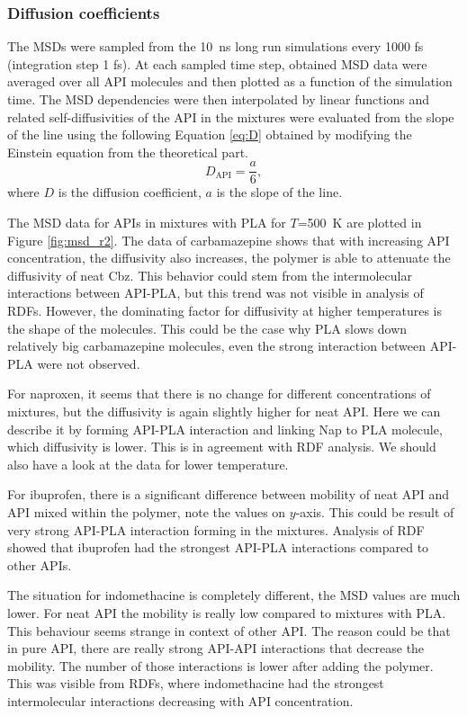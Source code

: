 \newpage
\subsubsection{Diffusion coefficients}
The MSDs were sampled from the 10~ns long run simulations every 1000 fs (integration step 1 fs). At each sampled time step, obtained MSD data were averaged over all API molecules and then plotted as a function of the simulation time. The MSD dependencies were then interpolated by linear functions and related self-diffusivities of the API in the mixtures were evaluated from the slope of the line using the following Equation \ref{eq:D} obtained by modifying the Einstein equation from the theoretical part.
\vspace{-0.25cm}
\begin{equation}\label{eq:D}
	D_{\text{API}} = \frac{a}{6}, 
\end{equation}
where $D$ is the diffusion coefficient, $a$ is the slope of the line.

The MSD data for APIs in mixtures with PLA for $T$=500~K are plotted in Figure \ref{fig:msd_r2}. The data of carbamazepine shows that with increasing API concentration, the diffusivity also increases, the polymer is able to attenuate the diffusivity of neat Cbz. This behavior could stem from the intermolecular interactions between API-PLA, but this trend was not visible in analysis of RDFs. However, the dominating factor for diffusivity at higher temperatures is the shape of the molecules. This could be the case why PLA slows down relatively big carbamazepine molecules, even the strong interaction between API-PLA were not observed. 

For naproxen, it seems that there is no change for different concentrations of mixtures, but the diffusivity is again slightly higher for neat API. Here we can describe it by forming API-PLA interaction and linking Nap to PLA molecule, which diffusivity is lower. This is in agreement with RDF analysis. We should also have a look at the data for lower temperature.

For ibuprofen, there is a significant difference between mobility of neat API and API mixed within the polymer, note the values on $y$-axis. This could be result of very strong API-PLA interaction forming in the mixtures. Analysis of RDF showed that ibuprofen had the strongest API-PLA interactions compared to other APIs.

The situation for indomethacine is completely different, the MSD values are much lower. For neat API the mobility is really low compared to mixtures with PLA. This behaviour seems strange in context of other API. The reason could be that in pure API, there are really strong API-API interactions that decrease the mobility. The number of those interactions is lower after adding the polymer. This was visible from RDFs, where indomethacine had the strongest intermolecular interactions decreasing with API concentration. 

